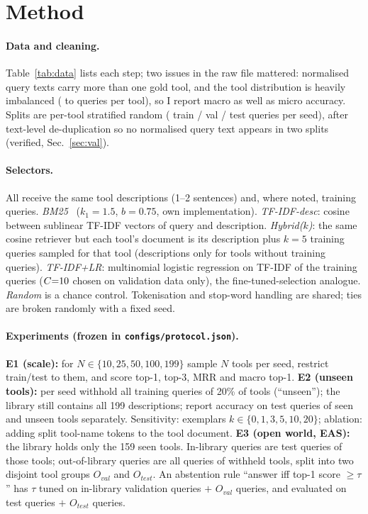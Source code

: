 \documentclass[10pt,twocolumn]{article}
\begin{document}
\section{Method}
\paragraph{Data and cleaning.} Table~\ref{tab:data} lists each step; two issues in the raw file mattered: \DambigRemoved{} normalised query texts carry more than one gold tool, and the tool distribution is heavily imbalanced (\DminQ{} to \DmaxQ{} queries per tool), so I report macro as well as micro accuracy. Splits are per-tool stratified random (\Dsplittrain{} train / \Dsplitval{} val / \Dsplittest{} test queries per seed), after text-level de-duplication so no normalised query text appears in two splits (verified, Sec.~\ref{sec:val}).

\paragraph{Selectors.} All receive the same tool descriptions (1--2 sentences) and, where noted, training queries.
\emph{BM25}~\cite{robertson2009bm25} ($k_1{=}1.5$, $b{=}0.75$, own implementation). \emph{TF-IDF-desc}: cosine between sublinear TF-IDF vectors of query and description. \emph{Hybrid($k$)}: the same cosine retriever but each tool's document is its description plus $k{=}5$ training queries sampled for that tool (descriptions only for tools without training queries). \emph{TF-IDF+LR}: multinomial logistic regression on TF-IDF of the training queries ($C{=}10$ chosen on validation data only), the fine-tuned-selection analogue. \emph{Random} is a chance control. Tokenisation and stop-word handling are shared; ties are broken randomly with a fixed seed.

\paragraph{Experiments (frozen in \texttt{configs/protocol.json}).}
\textbf{E1 (scale):} for $N\in\{10,25,50,100,199\}$ sample $N$ tools per seed, restrict train/test to them, and score top-1, top-3, MRR and macro top-1.
\textbf{E2 (unseen tools):} per seed withhold all training queries of 20\% of tools (``unseen''); the library still contains all 199 descriptions; report accuracy on test queries of seen and unseen tools separately. Sensitivity: exemplars $k\in\{0,1,3,5,10,20\}$; ablation: adding split tool-name tokens to the tool document.
\textbf{E3 (open world, EAS):} the library holds only the 159 seen tools. In-library queries are test queries of those tools; out-of-library queries are all queries of withheld tools, split into two disjoint tool groups $O_{val}$ and $O_{test}$. An abstention rule ``answer iff top-1 score $\ge\tau$'' has $\tau$ tuned on in-library validation queries $+$ $O_{val}$ queries, and evaluated on test queries $+$ $O_{test}$ queries.
\end{document}
